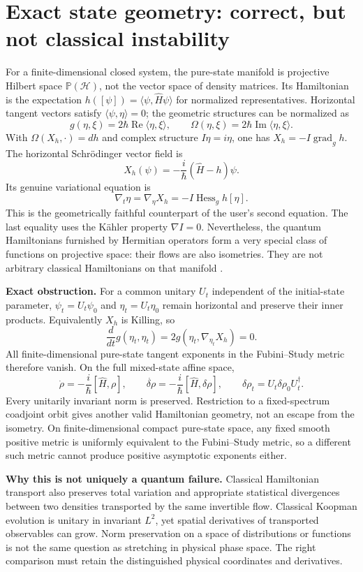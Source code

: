 \documentclass[11pt,a4paper]{article}
\begin{document}
\section{Exact state geometry: correct, but not classical instability}
For a finite-dimensional closed system, the pure-state manifold is projective Hilbert space $\mathbb{P}(\mathcal H)$, not the vector space of density matrices. Its Hamiltonian is the expectation $h([\psi])=\langle\psi,\widehat H\psi\rangle$ for normalized representatives. Horizontal tangent vectors satisfy $\langle\psi,\eta\rangle=0$; the geometric structures can be normalized as
\[g(\eta,\xi)=2\hbar\operatorname{Re}\langle\eta,\xi\rangle,\qquad\Omega(\eta,\xi)=2\hbar\operatorname{Im}\langle\eta,\xi\rangle.\]
With $\Omega(X_h,\cdot)=dh$ and complex structure $I\eta=i\eta$, one has $X_h=-I\operatorname{grad}_g h$. The horizontal Schr\"odinger vector field is
\[X_h(\psi)=-\frac{i}{\hbar}(\widehat H-h)\psi.\]
Its genuine variational equation is
\[\nabla_t\eta=\nabla_\eta X_h=-I\operatorname{Hess}_g h[\eta].\]
This is the geometrically faithful counterpart of the user's second equation. The last equality uses the K\"ahler property $\nabla I=0$. Nevertheless, the quantum Hamiltonians furnished by Hermitian operators form a very special class of functions on projective space: their flows are also isometries. They are not arbitrary classical Hamiltonians on that manifold \cite{ashtekar}.

\textbf{Exact obstruction.} For a common unitary $U_t$ independent of the initial-state parameter, $\psi_t=U_t\psi_0$ and $\eta_t=U_t\eta_0$ remain horizontal and preserve their inner products. Equivalently $X_h$ is Killing, so
\[\frac{d}{dt}g(\eta_t,\eta_t)=2g(\eta_t,\nabla_{\eta_t}X_h)=0.\]
All finite-dimensional pure-state tangent exponents in the Fubini--Study metric therefore vanish. On the full mixed-state affine space,
\[\dot\rho=-\frac{i}{\hbar}[\widehat H,\rho],\qquad\dot{\delta\rho}=-\frac{i}{\hbar}[\widehat H,\delta\rho],\qquad\delta\rho_t=U_t\delta\rho_0U_t^\dagger.\]
Every unitarily invariant norm is preserved. Restriction to a fixed-spectrum coadjoint orbit gives another valid Hamiltonian geometry, not an escape from the isometry. On finite-dimensional compact pure-state space, any fixed smooth positive metric is uniformly equivalent to the Fubini--Study metric, so a different such metric cannot produce positive asymptotic exponents either.

\textbf{Why this is not uniquely a quantum failure.} Classical Hamiltonian transport also preserves total variation and appropriate statistical divergences between two densities transported by the same invertible flow. Classical Koopman evolution is unitary in invariant $L^2$, yet spatial derivatives of transported observables can grow. Norm preservation on a space of distributions or functions is not the same question as stretching in physical phase space. The right comparison must retain the distinguished physical coordinates and derivatives.
\end{document}
